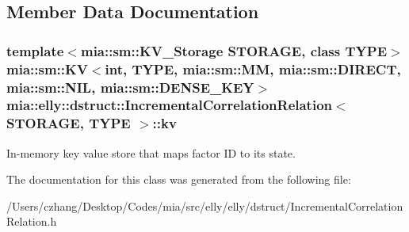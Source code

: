 \subsection{Member Data Documentation}
\hypertarget{classmia_1_1elly_1_1dstruct_1_1_incremental_correlation_relation_a7724160f4b8b89f2d9ec00bd235a2123}{
\subsubsection[{kv}]{\setlength{\rightskip}{0pt plus 5cm}template$<$mia\-::sm\-::\-K\-V\-\_\-\-Storage S\-T\-O\-R\-A\-G\-E, class T\-Y\-P\-E$>$ {\bf mia\-::sm\-::\-K\-V}$<$int, T\-Y\-P\-E, mia\-::sm\-::\-M\-M, mia\-::sm\-::\-D\-I\-R\-E\-C\-T, mia\-::sm\-::\-N\-I\-L, mia\-::sm\-::\-D\-E\-N\-S\-E\-\_\-\-K\-E\-Y$>$ {\bf mia\-::elly\-::dstruct\-::\-Incremental\-Correlation\-Relation}$<$ S\-T\-O\-R\-A\-G\-E, T\-Y\-P\-E $>$\-::kv}}\label{classmia_1_1elly_1_1dstruct_1_1_incremental_correlation_relation_a7724160f4b8b89f2d9ec00bd235a2123}
In-\/memory key value store that maps factor I\-D to its state. 

The documentation for this class was generated from the following file\-:\begin{DoxyCompactItemize}
\item 
/\-Users/czhang/\-Desktop/\-Codes/mia/src/elly/elly/dstruct/Incremental\-Correlation\-Relation.\-h\end{DoxyCompactItemize}
